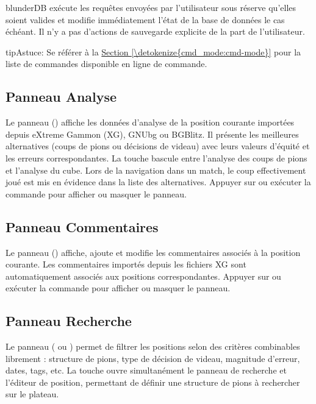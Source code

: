 \documentclass[letterpaper,10pt,french]{sphinxmanual}
\begin{document}
\sphinxAtStartPar
blunderDB exécute les requêtes envoyées par l’utilisateur sous réserve
qu’elles soient valides et modifie immédiatement l’état de la base de données
le cas échéant. Il n’y a pas d’actions de sauvegarde explicite de la part
de l’utilisateur.

\begin{sphinxadmonition}{tip}{Astuce:}
\sphinxAtStartPar
Se référer à la \hyperref[\detokenize{cmd_mode:cmd-mode}]{Section \ref{\detokenize{cmd_mode:cmd-mode}}} pour la liste de commandes
disponible en ligne de commande.
\end{sphinxadmonition}


\subsection{Panneau Analyse}
\label{\detokenize{manuel:panneau-analyse}}\label{\detokenize{manuel:id3}}
\sphinxAtStartPar
Le panneau  () affiche les données d’analyse de la position
courante importées depuis eXtreme Gammon (XG), GNUbg ou BGBlitz. Il présente
les meilleures alternatives (coups de pions ou décisions de videau) avec leurs
valeurs d’équité et les erreurs correspondantes. La touche  bascule entre
l’analyse des coups de pions et l’analyse du cube. Lors de la navigation dans
un match, le coup effectivement joué est mis en évidence dans la liste des
alternatives. Appuyer sur  ou exécuter la commande  pour
afficher ou masquer le panneau.


\subsection{Panneau Commentaires}
\label{\detokenize{manuel:panneau-commentaires}}\label{\detokenize{manuel:id4}}
\sphinxAtStartPar
Le panneau  () affiche, ajoute et modifie les
commentaires associés à la position courante. Les commentaires importés depuis
les fichiers XG sont automatiquement associés aux positions correspondantes.
Appuyer sur  ou exécuter la commande  pour afficher ou
masquer le panneau.


\subsection{Panneau Recherche}
\label{\detokenize{manuel:panneau-recherche}}\label{\detokenize{manuel:id5}}
\sphinxAtStartPar
Le panneau  ( ou ) permet de filtrer les positions
selon des critères combinables librement : structure de pions, type de décision
de videau, magnitude d’erreur, dates, tags, etc. La touche  ouvre
simultanément le panneau de recherche et l’éditeur de position, permettant de
définir une structure de pions à rechercher sur le plateau.
\end{document}
